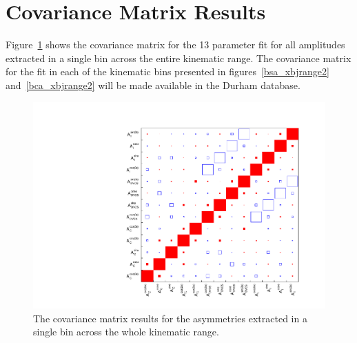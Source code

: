 \section{Covariance Matrix Results}
Figure~\ref{pic:covmat} shows the covariance matrix for the 13 parameter fit for all amplitudes extracted in a single bin across the entire kinematic range. The covariance matrix for the fit in each of the kinematic bins presented in figures~\ref{bsa_xbjrange2} and~\ref{bca_xbjrange2} will be made available in the Durham database.
\begin{figure}[tbh]
\centering
\includegraphics[width=\textwidth]{CovMat.pdf}
\caption{The covariance matrix results for the asymmetries extracted in a single bin across the whole kinematic range.}
\label{pic:covmat}
\end{figure}

